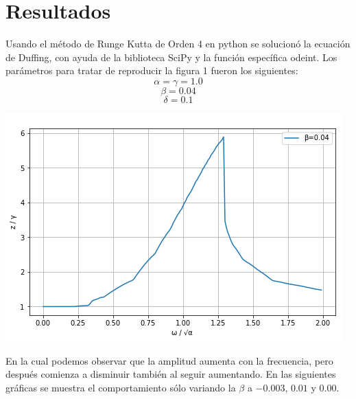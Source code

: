 \documentclass{article}
\begin{document}
\section{Resultados}
Usando el método de Runge Kutta de Orden 4 en python se solucionó la ecuación de Duffing, con ayuda de la biblioteca SciPy y la función específica odeint.
Los parámetros para tratar de reproducir la figura 1 fueron los siguientes:
$$\alpha = \gamma = 1.0$$
$$\beta = 0.04$$
$$\delta = 0.1$$
\begin{center}
    \includegraphics[scale = 0.6]{04.png}
\end{center}
En la cual podemos observar que la amplitud aumenta con la frecuencia, pero después comienza a disminuir también al seguir aumentando.
En las siguientes gráficas se muestra el comportamiento sólo variando la $\beta$ a $-0.003$, $0.01$ y $0.00$.
\end{document}
